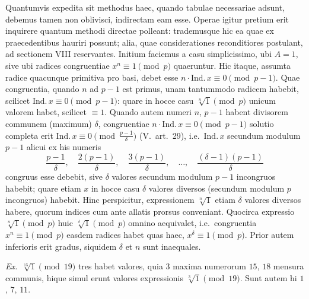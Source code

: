 \documentclass[12pt,a4paper]{article}
\theoremstyle{plain}
\theoremstyle{definition}
\theoremstyle{remark}
\begin{document}
Quantumvis expedita sit methodus haec, quando tabulae necessariae adsunt, debemus tamen non oblivisci, indirectam eam esse. Operae igitur pretium erit inquirere quantum methodi directae polleant: trademusque hic ea quae ex praecedentibus hauriri possunt; alia, quae considerationes reconditiores postulant, ad sectionem VIII reservantes. Initium faciemus a casu simplicissimo, ubi $A = 1$, sive ubi radices congruentiae $x^n \equiv 1 \pmod{p}$ quaeruntur. Hic itaque, assumta radice quacunque primitiva pro basi, debet esse $n \cdot \text{Ind.}\,x \equiv 0 \pmod{p-1}$. Quae congruentia, quando $n$ ad $p-1$ est primus, unam tantummodo radicem habebit, scilicet $\text{Ind.}\,x \equiv 0 \pmod{p-1}$: quare in hocce casu $\sqrt[n]{1} \pmod{p}$ unicum valorem habet, scilicet $\equiv 1$. Quando autem numeri $n$, $p-1$ habent divisorem communem (maximum) $\delta$, congruentiae $n \cdot \text{Ind.}\,x \equiv 0 \pmod{p-1}$ solutio completa erit $\text{Ind.}\,x \equiv 0 \pmod{\frac{p-1}{\delta}}$ (V.\ art.~29), i.e.\ $\text{Ind.}\,x$ secundum modulum $p-1$ alicui ex his numeris
\[
\frac{p-1}{\delta},\quad \frac{2(p-1)}{\delta},\quad \frac{3(p-1)}{\delta},\quad \dots,\quad \frac{(\delta-1)(p-1)}{\delta}
\]
congruus esse debebit, sive $\delta$ valores secundum modulum $p-1$ incongruos habebit; quare etiam $x$ in hocce casu $\delta$ valores diversos (secundum modulum $p$ incongruos) habebit. Hinc perspicitur, expressionem $\sqrt[n]{1}$ etiam $\delta$ valores diversos habere, quorum indices cum ante allatis prorsus conveniant. Quocirca expressio $\sqrt[n]{1} \pmod{p}$ huic $\sqrt[\delta]{1} \pmod{p}$ omnino aequivalet, i.e.\ congruentia $x^n \equiv 1 \pmod{p}$ easdem radices habet quas haec, $x^\delta \equiv 1 \pmod{p}$. Prior autem inferioris erit gradus, siquidem $\delta$ et $n$ sunt inaequales.

\textit{Ex.}\ $\sqrt[15]{1} \pmod{19}$ tres habet valores, quia $3$ maxima numerorum $15$, $18$ mensura communis, hique simul erunt valores expressionis $\sqrt[3]{1} \pmod{19}$. Sunt autem hi $1$, $7$, $11$.
\end{document}
